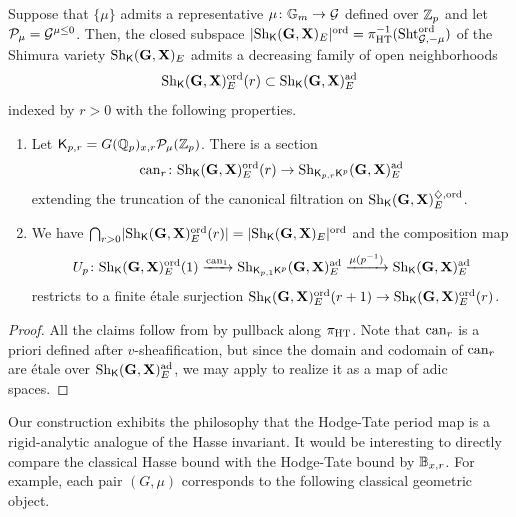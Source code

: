 \documentclass[12pt,reqno]{amsart}
\begin{document}
\begin{cor} \label{cor:canonical_filtration}
    Suppose that $\{ \mu \}$ admits a representative $\mu \colon \mathbb{G}_m \to {\mathcal{G}}$ defined over $\mathbb{Z}_p$ and let ${\mathcal{P}}_\mu = {\mathcal{G}}^{\mu \leq 0}$. Then, the closed subspace $\lvert {\operatorname{Sh}}_{{\mathsf{K}}}(\mathbf{G}, \mathbf{X})_E\rvert^{{\operatorname{ord}}} = \pi_{\operatorname{HT}}^{-1}({\operatorname{Sht}}_{{\mathcal{G}}, -\mu}^{\operatorname{ord}})$ of the Shimura variety ${\operatorname{Sh}}_{{\mathsf{K}}}(\mathbf{G}, \mathbf{X})_E$ admits a decreasing family of open neighborhoods
    \[
        {\operatorname{Sh}}_{{\mathsf{K}}}(\mathbf{G}, \mathbf{X})_E^{{\operatorname{ord}}}(r) \subset {\operatorname{Sh}}_{{\mathsf{K}}}(\mathbf{G}, \mathbf{X})_E^{\operatorname{ad}}
    \]
    indexed by $r > 0$ with the following properties. 
    \begin{enumerate}
        \item Let ${\mathsf{K}}_{p, r} = G(\mathbb{Q}_p)_{x, r} {\mathcal{P}}_\mu(\mathbb{Z}_p)$.
        There is a section
        \[
            {\operatorname{can}}_r \colon {\operatorname{Sh}}_{{\mathsf{K}}}(\mathbf{G}, \mathbf{X})_E^{{\operatorname{ord}}}(r) \to {\operatorname{Sh}}_{{\mathsf{K}}_{p, r} {\mathsf{K}}^p}(\mathbf{G}, \mathbf{X})_E^{\operatorname{ad}}
        \]
        extending the truncation of the canonical filtration on ${\operatorname{Sh}}_{{\mathsf{K}}}(\mathbf{G}, \mathbf{X})_E^{\diamondsuit, {\operatorname{ord}}}$. 
        \item We have $\bigcap_{r > 0} \lvert {\operatorname{Sh}}_{{\mathsf{K}}}(\mathbf{G}, \mathbf{X})_E^{{\operatorname{ord}}}(r) \rvert = \lvert {\operatorname{Sh}}_{{\mathsf{K}}}(\mathbf{G}, \mathbf{X})_E\rvert^{{\operatorname{ord}}}$ and the composition map
        \[
            U_p \colon {\operatorname{Sh}}_{{\mathsf{K}}}(\mathbf{G}, \mathbf{X})_E^{{\operatorname{ord}}}(1) \xrightarrow{{\operatorname{can}}_1} {\operatorname{Sh}}_{{\mathsf{K}}_{p, 1} {\mathsf{K}}^p}(\mathbf{G}, \mathbf{X})_E^{\operatorname{ad}} \xrightarrow{\mu(p^{-1})} {\operatorname{Sh}}_{{\mathsf{K}}}(\mathbf{G}, \mathbf{X})_E^{\operatorname{ad}}
        \]
        restricts to a finite \'{e}tale surjection ${\operatorname{Sh}}_{{\mathsf{K}}}(\mathbf{G}, \mathbf{X})_E^{{\operatorname{ord}}}(r+1) \to {\operatorname{Sh}}_{{\mathsf{K}}}(\mathbf{G}, \mathbf{X})_E^{{\operatorname{ord}}}(r)$. 
    \end{enumerate}
\end{cor}
\begin{proof}
    All the claims follow from  by pullback along $\pi_{\operatorname{HT}}$. Note that ${\operatorname{can}}_r$ is a priori defined after $v$-sheafification, but since the domain and codomain of ${\operatorname{can}}_r$ are \'{e}tale over ${\operatorname{Sh}}_{{\mathsf{K}}}(\mathbf{G}, \mathbf{X})_E^{\operatorname{ad}}$, we may apply \cite[Lemma 15.6]{Sch17} to realize it as a map of adic spaces. 
\end{proof}

Our construction exhibits the philosophy that the Hodge-Tate period map is a rigid-analytic analogue of the Hasse invariant. It would be interesting to directly compare the classical Hasse bound with the Hodge-Tate bound by $\mathbb{B}_{x, r}$. For example, each pair $(G, \mu)$ corresponds to the following classical geometric object. 
\end{document}
